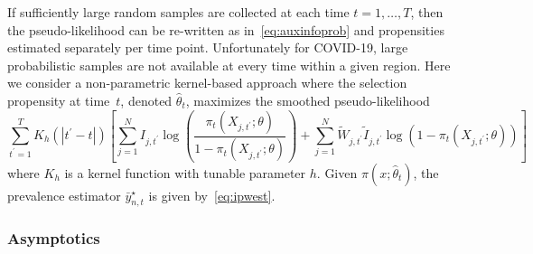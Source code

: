 \documentclass[11pt]{amsart}
\numberwithin{equation}{section}
\theoremstyle{plain}
\begin{document}
If sufficiently large random samples are collected at each time $t =1,\ldots,T$, then the pseudo-likelihood can be re-written as in~\eqref{eq:auxinfoprob} and propensities estimated separately per time point.  Unfortunately for COVID-19, large probabilistic samples are not available at every time within a given region.  Here we consider a non-parametric kernel-based approach where the selection propensity at time~$t$, denoted $\hat \theta_t$, maximizes the smoothed pseudo-likelihood
$$
\sum_{t^\prime=1}^T K_h(|t^\prime - t|) \left[ \sum_{j=1}^N I_{j,t^\prime} \log \left( \frac{\pi_t (X_{j,t^\prime}; \theta)}{1-\pi_t(X_{j,t^\prime}; \theta)} \right) + \sum_{j=1}^N \tilde W_{j,t^\prime} \tilde I_{j,t^\prime} \log \left( 1 - \pi_t (X_{j,t^\prime}; \theta) \right) \right]
$$
where $K_h$ is a kernel function with tunable parameter $h$. Given $\pi (x;\hat \theta_t)$, the prevalence estimator $\bar y_{n,t}^\star$ is given by~\ref{eq:ipwest}.


%
%
%
%
%
%
%
%
\subsubsection{Asymptotics}
\end{document}
